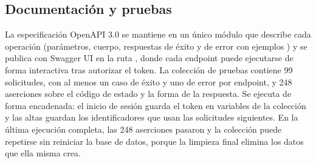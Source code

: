 \subsection{Documentación y pruebas}
La especificación OpenAPI 3.0 se mantiene en un único módulo que describe cada operación (parámetros, cuerpo, respuestas de éxito y de error con ejemplos \cite{openapi}) y se publica con Swagger UI en la ruta , donde cada endpoint puede ejecutarse de forma interactiva tras autorizar el token. La colección de pruebas contiene 99 solicitudes, con al menos un caso de éxito y uno de error por endpoint, y 248 aserciones sobre el código de estado y la forma de la respuesta. Se ejecuta de forma encadenada: el inicio de sesión guarda el token en variables de la colección y las altas guardan los identificadores que usan las solicitudes siguientes. En la última ejecución completa, las 248 aserciones pasaron y la colección puede repetirse sin reiniciar la base de datos, porque la limpieza final elimina los datos que ella misma crea.
